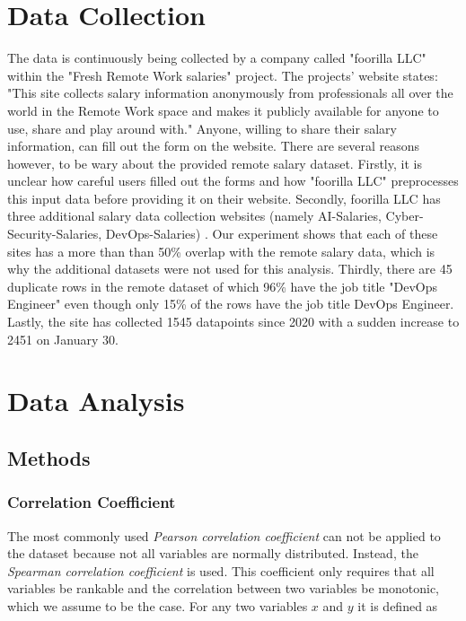 \documentclass{article}
\begin{document}
\section{Data Collection}
The data is continuously being collected by a company called "foorilla LLC" within the "Fresh Remote Work salaries" project. The projects' website states: "This site collects salary information anonymously from professionals all over the world in the Remote Work space and makes it publicly available for anyone to use, share and play around with." Anyone, willing to share their salary information, can fill out the form on the website. There are several reasons however, to be wary about the provided remote salary dataset. Firstly, it is unclear how careful users filled out the forms and how "foorilla LLC" preprocesses this input data before providing it on their website. Secondly, foorilla LLC has three additional salary data collection websites (namely AI-Salaries, Cyber-Security-Salaries, DevOps-Salaries) \cite{datasets2022}. Our experiment shows that each of these sites has a more than than 50\% overlap with the remote salary data, which is why the additional datasets were not used for this analysis. Thirdly, there are 45 duplicate rows in the remote dataset of which 96\% have the job title "DevOps Engineer" even though only 15\% of the rows have the job title DevOps Engineer. Lastly, the site has collected 1545 datapoints since 2020 with a sudden increase to 2451 on January 30.

\section{Data Analysis}
\subsection{Methods}
\subsubsection{Correlation Coefficient}

The most commonly used \textit{Pearson correlation coefficient} can not be applied to the dataset because not all variables are normally distributed. Instead, the \textit{Spearman correlation coefficient} is used. This coefficient only requires that all variables be rankable and the correlation between two variables be monotonic, which we assume to be the case. For any two variables $x$ and $y$ it is defined as
\end{document}
